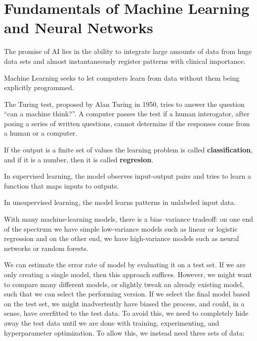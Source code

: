 \chapter{Fundamentals of Machine Learning and Neural Networks}
\label{ml-fundamentals}

The promise of AI lies in the ability 
to integrate large amounts of data from huge data sets
and almost instantaneously register patterns
with clinical importance.

Machine Learning seeks to let computers learn from data
without them being explicitly programmed.


The Turing test, proposed by Alan Turing in 1950,
tries to answer the question \enquote{can a machine think?}.
A computer passes the test if a human interogator,
after posing a series of written questions,
cannot determine if the responses come from a human or a computer.



If the output is a finite set of values
the learning problem is called \textbf{classification},
and if it is a number, then it is called \textbf{regresion}.

In supervised learning, the model observes input-output pairs
and tries to learn a function that maps inputs to outputs.

In unsupervised learning, the model learns patterns in unlabeled input data.

With many machine-learning models, there is a bias--variance tradeoff:
on one end of the spectrum we have simple low-variance models 
such as linear or logistic regression
and on the other end, we have high-variance models
such as neural networks or random forests.

We can estimate the error rate of model
by evaluating it on a test set.
If we are only creating a single model,
then this approach suffices. 
However, we might want to compare many different models,
or slightly tweak an already existing model,
such that we can select the performing version.
If we select the final model based on the test set,
we might inadvertently have biased the process,
and could, in a sense, have overfitted to the test data.
To avoid this, we need to completely hide away the test data
until we are done with training, experimenting, 
and hyperparameter optimization.
To allow this, we instead need three sets of data:

